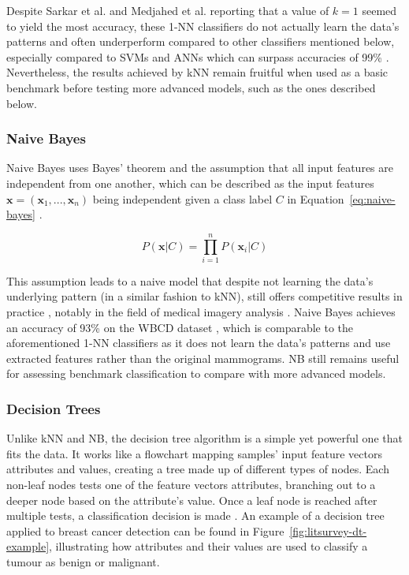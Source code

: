 Despite Sarkar et al. and Medjahed et al. reporting that a value of $k=1$ seemed to yield the most accuracy, these 1-NN classifiers do not actually learn the data's patterns and often underperform compared to other classifiers mentioned below, especially compared to SVMs and ANNs which can surpass accuracies of 99\% \citep{Yue2018, Asri2016, Montazeri2016}. Nevertheless, the results achieved by kNN remain fruitful when used as a basic benchmark before testing more advanced models, such as the ones described below.

\subsubsection{Naive Bayes}

Naive Bayes uses Bayes' theorem and the assumption that all input features are independent from one another, which can be described as the input features $\textbf{x}=(\textbf{x}_1, ..., \textbf{x}_n)$ being independent given a class label $C$ in Equation~\ref{eq:naive-bayes} \citep{rish2001empirical}.

\begin{equation}
\label{eq:naive-bayes}
    P(\textbf{x}|C)=\prod_{i=1}^{n}P(\textbf{x}_i|C)
\end{equation}

This assumption leads to a naive model that despite not learning the data's underlying pattern (in a similar fashion to kNN), still offers competitive results in practice \citep{russell2002artificial}, notably in the field of medical imagery analysis \citep{rish2001empirical}. Naive Bayes achieves an accuracy of 93\% on the WBCD dataset \citep{Kharya2014}, which is comparable to the aforementioned 1-NN classifiers as it does not learn the data's patterns and use extracted features rather than the original mammograms. NB still remains useful for assessing benchmark classification to compare with more advanced models.

\subsubsection{Decision Trees}
\label{sec:litsurvey-dts}

Unlike kNN and NB, the decision tree algorithm is a simple yet powerful one that fits the data. It works like a flowchart mapping samples' input feature vectors attributes and values, creating a tree made up of different types of nodes. Each non-leaf nodes tests one of the feature vectors attributes, branching out to a deeper node based on the attribute's value. Once a leaf node is reached after multiple tests, a classification decision is made \citep{quinlan2014c4}. An example of a decision tree applied to breast cancer detection can be found in Figure~\ref{fig:litsurvey-dt-example}, illustrating how attributes and their values are used to classify a tumour as benign or malignant.\\

